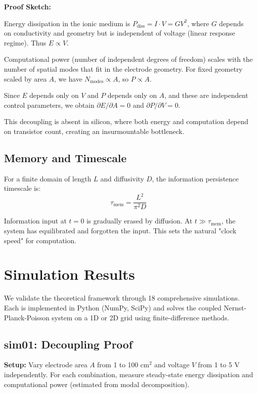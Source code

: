 \documentclass[11pt]{article}
\begin{document}
\textbf{Proof Sketch:}

Energy dissipation in the ionic medium is $P_{\text{diss}} = I \cdot V = G V^2$, where $G$ depends on conductivity and geometry but is independent of voltage (linear response regime). Thus $E \propto V$.

Computational power (number of independent degrees of freedom) scales with the number of spatial modes that fit in the electrode geometry. For fixed geometry scaled by area $A$, we have $N_{\text{modes}} \propto A$, so $P \propto A$.

Since $E$ depends only on $V$ and $P$ depends only on $A$, and these are independent control parameters, we obtain $\partial E/\partial A = 0$ and $\partial P/\partial V = 0$.

This decoupling is absent in silicon, where both energy and computation depend on transistor count, creating an insurmountable bottleneck.

\subsection{Memory and Timescale}

For a finite domain of length $L$ and diffusivity $D$, the information persistence timescale is:
\begin{equation}
\tau_{\text{mem}} = \frac{L^2}{\pi^2 D}
\end{equation}

Information input at $t = 0$ is gradually erased by diffusion. At $t \gg \tau_{\text{mem}}$, the system has equilibrated and forgotten the input. This sets the natural "clock speed" for computation.

\section{Simulation Results}

We validate the theoretical framework through 18 comprehensive simulations. Each is implemented in Python (NumPy, SciPy) and solves the coupled Nernst-Planck-Poisson system on a 1D or 2D grid using finite-difference methods.

\subsection{sim01: Decoupling Proof}

\textbf{Setup:} Vary electrode area $A$ from 1 to 100 cm$^2$ and voltage $V$ from 1 to 5 V independently. For each combination, measure steady-state energy dissipation and computational power (estimated from modal decomposition).
\end{document}
